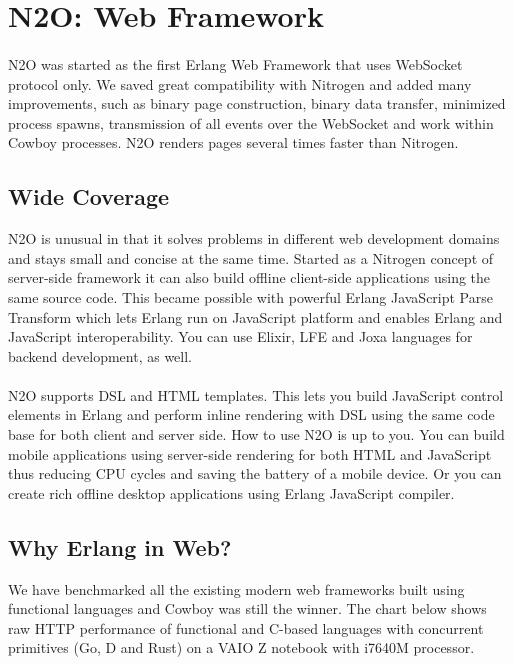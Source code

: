 \section{N2O: Web Framework}

\paragraph{}
N2O was started as the first Erlang Web Framework
that uses WebSocket protocol only. We saved great compatibility with Nitrogen
and added many improvements, such as binary page construction,
binary data transfer, minimized process spawns, transmission of all events over the WebSocket
and work within Cowboy processes. N2O renders pages several times faster than Nitrogen.

\subsection{Wide Coverage}
N2O is unusual in that it solves problems in different web development domains
and stays small and concise at the same time. Started as a Nitrogen concept
of server-side framework it can also build offline client-side applications
using the same source code. This became possible with powerful Erlang JavaScript Parse
Transform which lets Erlang run on JavaScript platform and enables Erlang and JavaScript
interoperability. You can use Elixir, LFE and Joxa languages for backend development, as well.

\paragraph{}
N2O supports DSL and HTML templates. This lets you build JavaScript
control elements in Erlang and perform inline rendering with DSL using
the same code base for both client and server side.
How to use N2O is up to you. You can build mobile applications using server-side rendering
for both HTML and JavaScript thus reducing CPU cycles and saving the battery of a mobile device.
Or you can create rich offline desktop applications using Erlang JavaScript compiler.

\newpage
\subsection*{Why Erlang in Web?}
We have benchmarked all the existing modern web frameworks built using functional
languages and Cowboy was still the winner. The chart below shows raw HTTP
performance of functional and C-based languages with concurrent
primitives (Go, D and Rust) on a VAIO Z notebook with i7640M processor.

